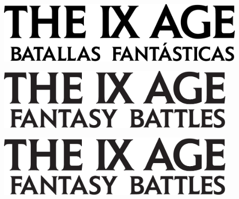 \begin{titlepage}
\begin{center}
\else

\ifdefined\languageisspanish

\includegraphics[height=3cm]{../Layout/pics/BRAND9AgeLogotype_ES.pdf}%

\else

\ifdefined\languageisgerman

\includegraphics[height=3cm]{../Layout/pics/BRAND9AgeLogotype.pdf}%

\else

\includegraphics[height=3cm]{../Layout/pics/BRAND9AgeLogotype.pdf}%

\fi
\fi
\fi
\fi

\ifdefined\thisisthepathsbook

	\vspace*{10pt}

\else

	\vspace*{0.5cm}


\end{center}
\end{titlepage}

